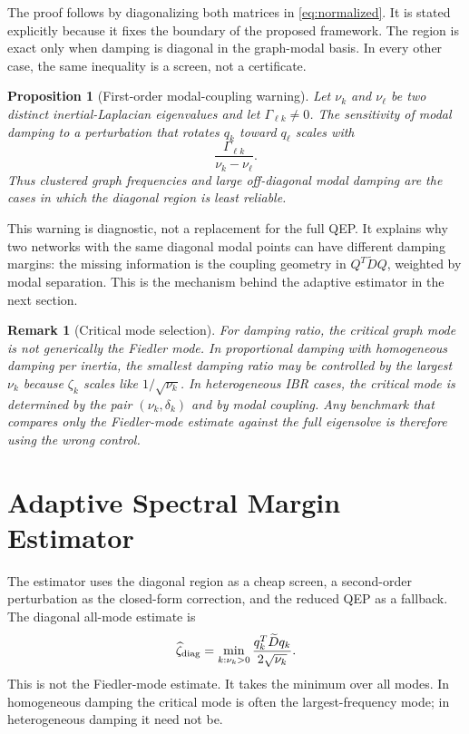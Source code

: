 \documentclass[journal]{IEEEtran}
\newtheorem{proposition}{Proposition}
\newtheorem{remark}{Remark}
\newcommand{\Dt}{\widetilde D}
\begin{document}
The proof follows by diagonalizing both matrices in \eqref{eq:normalized}. It is stated explicitly because it fixes the boundary of the proposed framework. The region is exact only when damping is diagonal in the graph-modal basis. In every other case, the same inequality is a screen, not a certificate.

\begin{proposition}[First-order modal-coupling warning]
Let $\nu_k$ and $\nu_\ell$ be two distinct inertial-Laplacian eigenvalues and let $\Gamma_{\ell k}\neq0$. The sensitivity of modal damping to a perturbation that rotates $q_k$ toward $q_\ell$ scales with
\begin{equation}
\frac{\Gamma_{\ell k}}{\nu_k-\nu_\ell}.
\end{equation}
Thus clustered graph frequencies and large off-diagonal modal damping are the cases in which the diagonal region is least reliable.
\end{proposition}

This warning is diagnostic, not a replacement for the full QEP. It explains why two networks with the same diagonal modal points can have different damping margins: the missing information is the coupling geometry in $Q^T\Dt Q$, weighted by modal separation. This is the mechanism behind the adaptive estimator in the next section.

\begin{remark}[Critical mode selection]
For damping ratio, the critical graph mode is not generically the Fiedler mode. In proportional damping with homogeneous damping per inertia, the smallest damping ratio may be controlled by the largest $\nu_k$ because $\zeta_k$ scales like $1/\sqrt{\nu_k}$. In heterogeneous IBR cases, the critical mode is determined by the pair $(\nu_k,\delta_k)$ and by modal coupling. Any benchmark that compares only the Fiedler-mode estimate against the full eigensolve is therefore using the wrong control.
\end{remark}

\section{Adaptive Spectral Margin Estimator}

The estimator uses the diagonal region as a cheap screen, a second-order perturbation as the closed-form correction, and the reduced QEP as a fallback. The diagonal all-mode estimate is
\begin{equation}
\widehat{\zeta}_{\rm diag}=\min_{k:\nu_k>0}\frac{q_k^T\Dt q_k}{2\sqrt{\nu_k}}.
\label{eq:zdiag}
\end{equation}
This is not the Fiedler-mode estimate. It takes the minimum over all modes. In homogeneous damping the critical mode is often the largest-frequency mode; in heterogeneous damping it need not be.
\end{document}
